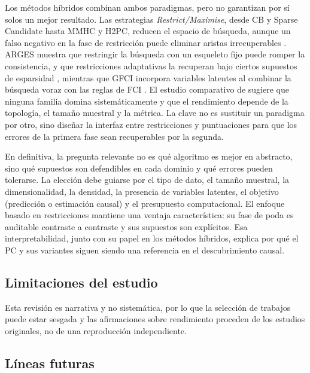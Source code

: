 Los métodos híbridos combinan ambos paradigmas, pero no garantizan por sí solos un mejor
resultado. Las estrategias \emph{Restrict/Maximise}, desde CB y Sparse Candidate hasta MMHC
y H2PC, reducen el espacio de búsqueda, aunque un falso negativo en la fase de restricción
puede eliminar aristas irrecuperables
\citep{SINGH1993259, Friedman1999SparseCandidate, tsamardinos2006max, Gasse2014H2PC}.
ARGES muestra que restringir la búsqueda con un esqueleto fijo puede romper la consistencia,
y que restricciones adaptativas la recuperan bajo ciertos supuestos de esparsidad
\citep{Nandy2018ARGES}, mientras que GFCI incorpora variables latentes al combinar la
búsqueda voraz con las reglas de FCI \citep{Ogarrio2016GFCI}. El estudio comparativo de
\citet{Karadag2026Evaluation} sugiere que ninguna familia domina sistemáticamente y que el
rendimiento depende de la topología, el tamaño muestral y la métrica. La clave no es
sustituir un paradigma por otro, sino diseñar la interfaz entre restricciones y
puntuaciones para que los errores de la primera fase sean recuperables por la segunda.

En definitiva, la pregunta relevante no es qué algoritmo es mejor en abstracto, sino qué
supuestos son defendibles en cada dominio y qué errores pueden tolerarse. La elección debe
guiarse por el tipo de dato, el tamaño muestral, la dimensionalidad, la densidad, la
presencia de variables latentes, el objetivo (predicción o estimación causal) y el
presupuesto computacional. El enfoque basado en restricciones mantiene una ventaja
característica: su fase de poda es auditable contraste a contraste y sus supuestos son
explícitos. Esa
interpretabilidad, junto con su papel en los métodos híbridos, explica por qué el PC y sus
variantes siguen siendo una referencia en el descubrimiento causal.

\subsection{Limitaciones del estudio}

Esta revisión es narrativa y no sistemática, por lo que la selección de trabajos puede estar
sesgada y las afirmaciones sobre rendimiento proceden de los estudios originales, no de una
reproducción independiente.

\subsection{Líneas futuras}

